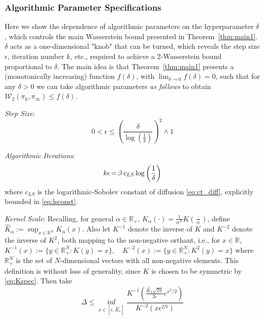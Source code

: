 \documentclass[journal,onecolumn]{IEEEtran}
\newcommand{\step}{\epsilon}
\newcommand{\reals}{\mathbb{R}}
\newcommand{\dimn}{N}
\newcommand{\wass}{\mathcal{W}_2}
\newcommand{\gibbs}{\ids_{\infty}}
\newcommand{\K}{K}
\newcommand{\dtlaw}{\ids_{k}} %
\newcommand{\LSconst}{c_{LS}}
\newcommand{\ids}{\pi}
\newcommand{\idw}{\gamma}
\newcommand{\ksp}{k,\idw}
\newcommand{\ksup}{\hat{K}}
\begin{document}
\subsubsection{Algorithmic Parameter Specifications}
\label{sec:paramspec}
Here we show the dependence of algorithmic parameters on the hyperparameter $\delta$, which controls the main Wasserstein bound presented in Theorem~\ref{thm:main1}. $\delta$ acts as a one-dimensional "knob" that can be turned, which reveals the step size $\step$, iteration number $k$, etc., required to achieve a 2-Wasserstein bound proportional to $\delta$. The main idea is that Theorem~\ref{thm:main1} presents a (monotonically increasing) function $f(\delta)$, with $\lim_{\delta\to0}f(\delta)=0$, such that for any $\delta>0$ we can take algorithmic parameters \textit{as follows} to obtain $\wass(\dtlaw,\gibbs) \leq f(\delta)$.

\textit{Step Size}: 
\begin{equation}
\label{eq:stepspec}
    0 < \step \leq \left( \frac{\delta}{\log \left(\frac{1}{\delta} \right)}\right)^2 \wedge 1
\end{equation}

\textit{Algorithmic Iterations}:
\begin{equation}
\label{eq:itspec}
k\step \,\color{black}{=}\, \beta\, \LSconst \log\left(\frac{1}{\delta}\right)
\end{equation}
where $\LSconst$ is the logarithmic-Sobolev constant of diffusion \eqref{eq:ct_diff}, explicitly bounded in \eqref{eq:lsconst}.

\textit{Kernel Scale}: Recalling, for general $\alpha\in \reals_+$, $\K_{\alpha}(\cdot) = \frac{1}{\alpha^{\dimn}}\K(\frac{\cdot}{\alpha})$, define $\ksup_{\alpha} := \sup_{x\in\reals^{\dimn}}\K_{\alpha}(x)$. Also let $K^{-1}$ denote the inverse of $K$ and $K^{-2}$ denote the inverse of $K^2$, both mapping to the non-negative orthant, i.e., for $x\in \reals$, $\K^{-1}(x) := \{y\in \reals_{+}^{\dimn} : \K(y) = x\},\quad 
        K^{-2}(x) := \{y\in \reals_{+}^{\dimn} : \K^2(y) = x\}$
where $\reals_{+}^{\dimn}$ is the set of $\dimn$-dimensional vectors with all non-negative elements. This definition is without loss of generality, since $\K$ is chosen to be symmetric by \eqref{eq:Kspec}. 
 Then take
\begin{equation}
\label{eq:delspec}
\Delta \leq \inf_{x \in [\step,\ksup_{\step}]}\frac{K^{-1}(\frac{\ksup_1\sqrt{2\pi}}{2\step}e^{x^2/2})}{K^{-2}(x\step^{2\dimn})}
\end{equation}
\end{document}
